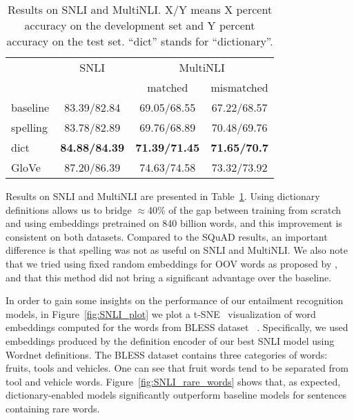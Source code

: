 \begin{table}
\caption{\label{tab:snli_results}Results on SNLI and MultiNLI. X/Y means X percent accuracy on the development set and Y percent accuracy on the test set. ``dict'' stands for ``dictionary''.
}
\centering
\begin{tabular}{lccc}
\toprule
 & SNLI & \multicolumn{2}{c}{MultiNLI} \\
{} &      &  matched & mismatched \\
\midrule
baseline        &  83.39/82.84 &  69.05/68.55 & 67.22/68.57 \\
\midrule
spelling   &  83.78/82.89 &  69.76/68.89 & 70.48/69.76  \\
dict            &  \textbf{84.88/84.39} & \textbf{71.39/71.45} & \textbf{71.65/70.7} \\
\midrule
GloVe           &  87.20/86.39 & 74.63/74.58 & 73.32/73.92 \\
\bottomrule
\end{tabular}
\end{table}


Results on SNLI and MultiNLI are presented in Table~\ref{tab:snli_results}. Using dictionary definitions allows us to bridge $\approx$40\% of the gap between training from scratch and using embeddings pretrained on 840 billion words, and this improvement is consistent on both datasets. Compared to the SQuAD results, an important difference is that spelling was not as useful on SNLI and MultiNLI. We also note that we tried using fixed random embeddings for OOV words as proposed by \citep{dhingra_comparative_2017}, and that this method did not bring a significant advantage over the baseline.

In order to gain some insights on the performance of our entailment recognition models, in Figure~\ref{fig:SNLI_plot} we plot a t-SNE~\citep{maaten2008visualizing} visualization of word embeddings computed for the words from BLESS dataset ~\citep{Baroni:2011:WBD:2140490.2140491}. Specifically, we used embeddings produced by the definition encoder of our best SNLI model using Wordnet definitions. The BLESS dataset contains three categories of words: fruits, tools and vehicles.
One can see that fruit words tend to be separated from tool and vehicle words. 
Figure~\ref{fig:SNLI_rare_words} shows that, as expected, dictionary-enabled models significantly outperform baseline models for sentences containing rare words. 

